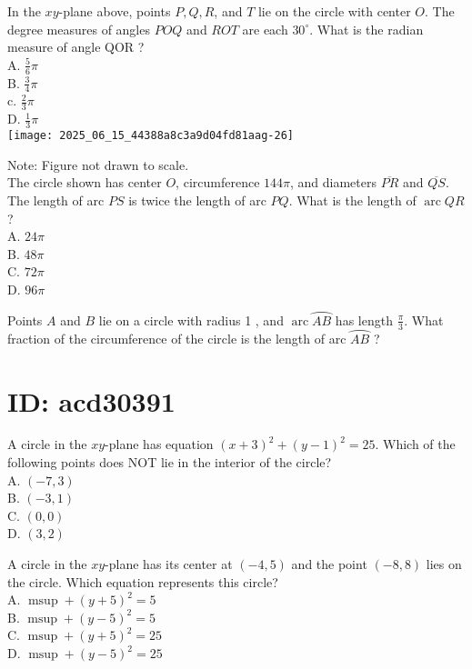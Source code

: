 In the $x y$-plane above, points $P, Q, R$, and $T$ lie on the circle with center $O$. The degree measures of angles $P O Q$ and $R O T$ are each $30^{\circ}$. What is the radian measure of angle QOR ?\\
A. $\frac{5}{6} \pi$\\
B. $\frac{3}{4} \pi$\\
c. $\frac{2}{3} \pi$\\
D. $\frac{1}{3} \pi$\\
\texttt{[image: 2025\_06\_15\_44388a8c3a9d04fd81aag-26]}

Note: Figure not drawn to scale.\\
The circle shown has center $O$, circumference $144 \pi$, and diameters $\overline{P R}$ and $\overline{Q S}$. The length of arc $P S$ is twice the length of arc $P Q$. What is the length of $\operatorname{arc} Q R$ ?\\
A. $24 \pi$\\
B. $48 \pi$\\
C. $72 \pi$\\
D. $96 \pi$

Points $A$ and $B$ lie on a circle with radius 1 , and $\operatorname{arc} \wideparen{A B}$ has length $\frac{\pi}{3}$. What fraction of the circumference of the circle is the length of arc $\wideparen{A B}$ ?

\section*{ID: acd30391}
A circle in the $x y$-plane has equation $(x+3)^{2}+(y-1)^{2}=25$. Which of the following points does NOT lie in the interior of the circle?\\
A. $(-7,3)$\\
B. $(-3,1)$\\
C. $(0,0)$\\
D. $(3,2)$

A circle in the $x y$-plane has its center at $(-4,5)$ and the point $(-8,8)$ lies on the circle. Which equation represents this circle?\\
A. $\operatorname{msup}+(y+5)^{2}=5$\\
B. $\operatorname{msup}+(y-5)^{2}=5$\\
C. $\operatorname{msup}+(y+5)^{2}=25$\\
D. $\operatorname{msup}+(y-5)^{2}=25$


